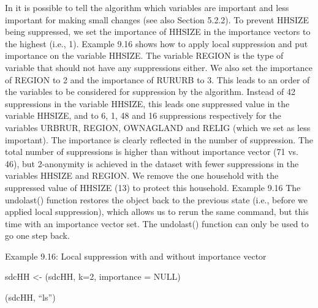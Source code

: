 \documentclass[letterpaper,10pt,english]{sphinxmanual}
\begin{document}
In  it is possible to tell the algorithm which variables are
important and less important for making small changes (see also Section
5.2.2). To prevent HHSIZE being suppressed, we set the importance of
HHSIZE in the importance vectors to the highest (i.e., 1). Example 9.16
shows how to apply local suppression and put importance on the variable
HHSIZE. The variable REGION is the type of variable that should not have
any suppressions either. We also set the importance of REGION to 2 and
the importance of RURURB to 3. This leads to an order of the variables
to be considered for suppression by the algorithm. Instead of 42
suppressions in the variable HHSIZE, this leads one suppressed value in
the variable HHSIZE, and to 6, 1, 48 and 16 suppressions respectively
for the variables URBRUR, REGION, OWNAGLAND and RELIG (which we set as
less important). The importance is clearly reflected in the number of
suppression. The total number of suppressions is higher than without
importance vector (71 vs. 46), but 2-anonymity is achieved in the
dataset with fewer suppressions in the variables HHSIZE and REGION. We
remove the one household with the suppressed value of HHSIZE (13) to
protect this household.  Example 9.16  The undolast()
function restores the  object back to the previous state
(i.e., before we applied local suppression), which allows us to rerun
the same command, but this time with an importance vector set. The
undolast() function can only be used to go one step back.

Example 9.16: Local suppression with and without importance vector

\begin{DUlineblock}{0em}
\item[] 
\item[] sdcHH \textless{}- (sdcHH, k=2, importance = NULL) 
\end{DUlineblock}

(sdcHH, “ls”)
\end{document}
